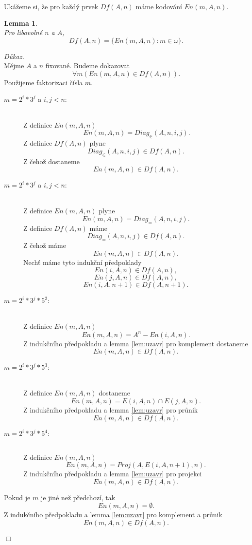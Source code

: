 \documentclass[12pt,a4paper]{article}
\newtheorem{lemma}[veta]{Lemma}
\newenvironment{proof}
{\noindent \textit{D\r{u}kaz.}}
{\hspace*{\fill} $\Box$}
\begin{document}
Uk\'{a}\v{z}eme si, \v{z}e pro ka\v{z}d\'{y} prvek $Df(A,n)$ m\'{a}me kodov\'{a}n\'{i} $ En(m,A,n) $.
\begin{lemma}
~\\
\label{lem:enume}
Pro libovoln\'{e} $ n $ a $A$, \[ Df(A,n)=\{En(m,A,n): m \in \omega \} .\]

\end{lemma}
\begin{proof}~\\
M\v{e}jme $ A $ a $n$ fixovan\'{e}. Budeme dokazovat  
\[ \forall m (En(m,A,n) \in Df(A,n))  .\] 
Pou\v{z}ijeme faktorizaci \v{c}\'{i}sla $ m $.
\begin{description}
\item [$ m=2^i*3^j $ a $ i,j < n $:]~\\
Z definice $En(m,A,n)$
\[ \ En(m,A,n) = Diag_{\in}(A,n,i,j) .\]  
Z definice $Df(A,n)$ plyne
\[ Diag_{\in}(A,n,i,j) \in Df(A,n) .\]
Z \v{c}eho\v{z} dostaneme
\[ En(m,A,n)  \in Df(A,n) .\]
\item [$ m=2^i*3^j $ a $ i,j < n $:]~\\
Z definice $En(m,A,n)$ plyne
\[ En(m,A,n) = Diag_{=}(A,n,i,j) .\] 
Z definice  $Df(A,n)$ m\'{a}me
\[ Diag_{=}(A,n,i,j) \in Df(A,n)  .\]
Z \v{c}eho\v{z} m\'{a}me
\[ En(m,A,n)  \in Df(A,n) .\]
Nech\v{t} m\'{a}me tyto induk\v{c}n\'{i} p\v{r}edpoklady
 \[ En(i,A,n) \in Df(A,n), \] 
\[ En(j,A,n) \in Df(A,n), \]
\[ En(i,A,n+1) \in Df(A,n+1). \]
\item [$ m=2^i*3^j*5^2$:]~\\ 
Z definice $ En(m,A,n) $
\[  En(m,A,n) = A^n - En(i,A,n) . \] 
Z induk\v{c}n\'{i}ho p\v{r}edpokladu a lemma \ref{lem:uzavr} pro komplement  dostaneme
\[ En(m,A,n) \in Df(A,n) .\]
\item [$ m=2^i*3^j*5^3$:]~\\ 
Z definice $En(m,A,n)$ dostaneme 
\[ En(m,A,n) = E(i,A,n) \cap E(j,A,n) .\] 
Z induk\v{c}n\'{i}ho p\v{r}edpokladu a lemma \ref{lem:uzavr} pro pr\r{u}nik
\[ En(m,A,n) \in Df(A,n) .\]
\item [$ m=2^i*3^j*5^4:$]~\\ 
Z definice $En(m,A,n)$
\[ En(m,A,n) = Proj(A,E(i,A,n+1),n) .\] 
Z induk\v{c}n\'{i}ho p\v{r}edpokladu a lemma \ref{lem:uzavr} pro projekci 
\[  En(m,A,n) \in Df(A,n) .\]
 \end{description}
Pokud je $ m $ je jin\'{e} ne\v{z} p\v{r}edchoz\'{i}, tak  
\[ En(m,A,n)= \emptyset .\] 
Z induk\v{c}n\'{i}ho p\v{r}edpokladu a lemma \ref{lem:uzavr} pro komplement a pr\r{u}nik  
 \[ En(m,A,n) \in Df(A,n) .\] \\

\end{proof}
\end{document}

